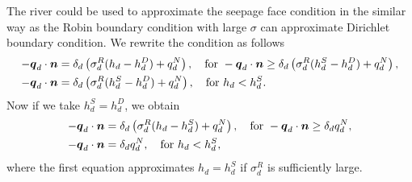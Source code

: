 The river could be used to approximate the seepage face condition in the similar way as the Robin boundary condition with large $\sigma$ 
can approximate Dirichlet boundary condition. We rewrite the condition as follows
\begin{align}
  -\mathbf{\boldsymbol{q}}_d \cdot \mathbf{\boldsymbol{n}} &= \delta_d\left(\sigma_d^R ( h_d - h_d^D) + q_d^N\right), \quad \text{for } -\mathbf{\boldsymbol{q}}_d \cdot \mathbf{\boldsymbol{n}} \ge \delta_d\left(\sigma_d^R ( h_d^S - h_d^D) + q_d^N\right),\\
  -\mathbf{\boldsymbol{q}}_d \cdot \mathbf{\boldsymbol{n}} &= \delta_d\left(\sigma_d^R ( h_d^S - h_d^D)+q_d^N\right), \quad \text{for } h_d < h_d^S.
\end{align}
Now if we take $h_d^S=h_d^D$, we obtain
\begin{align}
  -\mathbf{\boldsymbol{q}}_d \cdot \mathbf{\boldsymbol{n}} &= \delta_d\left(\sigma_d^R ( h_d - h_d^S) + q_d^N\right), \quad \text{for } -\mathbf{\boldsymbol{q}}_d \cdot \mathbf{\boldsymbol{n}} \ge \delta_d q_d^N,\\
  -\mathbf{\boldsymbol{q}}_d \cdot \mathbf{\boldsymbol{n}} &= \delta_d q_d^N, \quad \text{for } h_d < h_d^S,
\end{align}
where the first equation approximates $h_d = h_d^S$ if $\sigma_d^R$ is sufficiently large.


